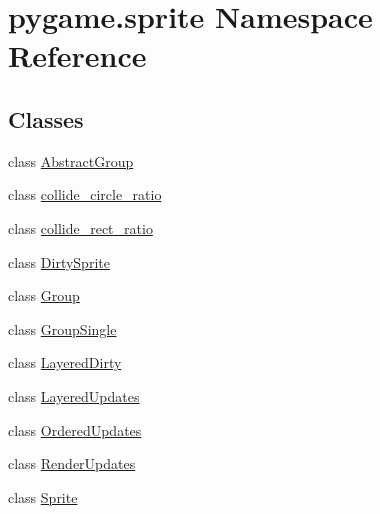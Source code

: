 \hypertarget{namespacepygame_1_1sprite}{}\section{pygame.\+sprite Namespace Reference}
\label{namespacepygame_1_1sprite}
\subsection*{Classes}
\begin{DoxyCompactItemize}
\item 
class \hyperlink{classpygame_1_1sprite_1_1_abstract_group}{Abstract\+Group}
\item 
class \hyperlink{classpygame_1_1sprite_1_1collide__circle__ratio}{collide\+\_\+circle\+\_\+ratio}
\item 
class \hyperlink{classpygame_1_1sprite_1_1collide__rect__ratio}{collide\+\_\+rect\+\_\+ratio}
\item 
class \hyperlink{classpygame_1_1sprite_1_1_dirty_sprite}{Dirty\+Sprite}
\item 
class \hyperlink{classpygame_1_1sprite_1_1_group}{Group}
\item 
class \hyperlink{classpygame_1_1sprite_1_1_group_single}{Group\+Single}
\item 
class \hyperlink{classpygame_1_1sprite_1_1_layered_dirty}{Layered\+Dirty}
\item 
class \hyperlink{classpygame_1_1sprite_1_1_layered_updates}{Layered\+Updates}
\item 
class \hyperlink{classpygame_1_1sprite_1_1_ordered_updates}{Ordered\+Updates}
\item 
class \hyperlink{classpygame_1_1sprite_1_1_render_updates}{Render\+Updates}
\item 
class \hyperlink{classpygame_1_1sprite_1_1_sprite}{Sprite}
\end{DoxyCompactItemize}
